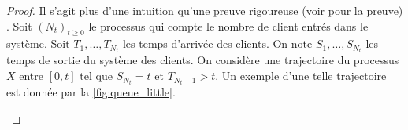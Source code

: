\begin{proof}
Il s'agit plus d'une intuition qu'une preuve rigoureuse (voir \citet{Little1961} pour la preuve) . Soit $(N_t)_{t\geq0}$ le processus qui compte le nombre de client entrés dans le système. Soit $T_1,\ldots, T_{N_t}$ les temps d'arrivée des clients. On note $S_1,\ldots, S_{N_t}$ les temps de sortie du système des clients. On considère une trajectoire du processus $X$ entre $[0, t]$ tel que $S_{N_t} = t$ et $T_{N_t+1}>t$. Un exemple d'une telle trajectoire est donnée par la \cref{fig:queue_little}.
\begin{figure}[ht!]
\begin{center}
\end{center}
\end{figure}
\end{proof}
